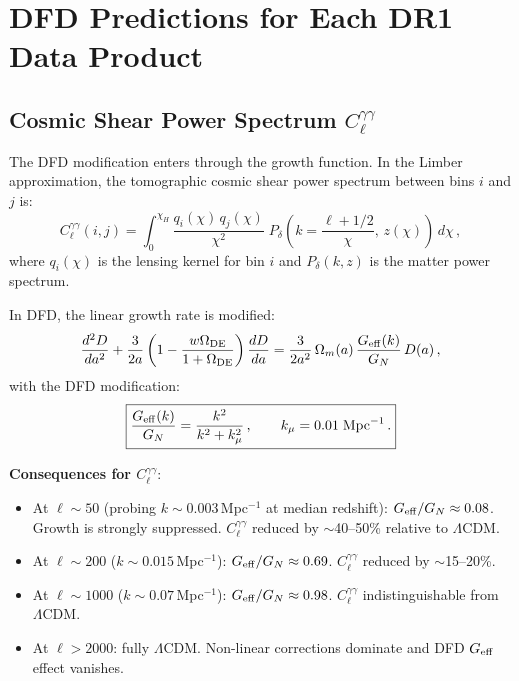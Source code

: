 \documentclass[11pt,a4paper]{article}
\newcommand{\LCDM}{$\Lambda$CDM}
\newcommand{\kmu}{k_\mu}
\newcommand{\Geff}{G_{\rm eff}}
\begin{document}
\section{DFD Predictions for Each DR1 Data Product}
\label{sec:predictions}

\subsection{Cosmic Shear Power Spectrum $C_\ell^{\gamma\gamma}$}

The DFD modification enters through the growth function. In the Limber
approximation, the tomographic cosmic shear power spectrum between bins
$i$ and $j$ is:
\begin{equation}
C_\ell^{\gamma\gamma}(i,j) = \int_0^{\chi_H}
  \frac{q_i(\chi)\,q_j(\chi)}{\chi^2}\;
  P_\delta\!\left(k = \frac{\ell+1/2}{\chi},\,z(\chi)\right)\,d\chi\,,
\label{eq:Cl_shear}
\end{equation}
where $q_i(\chi)$ is the lensing kernel for bin $i$ and $P_\delta(k,z)$
is the matter power spectrum.

In DFD, the linear growth rate is modified:
\begin{equation}
\frac{d^2 D}{da^2} + \frac{3}{2a}\left(1 - \frac{w \Omega_{\rm DE}}{1+\Omega_{\rm DE}}\right)\frac{dD}{da}
  = \frac{3}{2a^2}\,\Omega_m(a)\,\frac{\Geff(k)}{G_N}\,D(a)\,,
\end{equation}
with the DFD modification:
\begin{equation}
\boxed{\frac{\Geff(k)}{G_N} = \frac{k^2}{k^2 + \kmu^2}\,,
\qquad \kmu = 0.01\;\text{Mpc}^{-1}\,.}
\label{eq:Geff}
\end{equation}

\textbf{Consequences for $C_\ell^{\gamma\gamma}$}:
\begin{itemize}[nosep]
\item At $\ell \sim 50$ (probing $k \sim 0.003$\,Mpc$^{-1}$ at median
  redshift): $\Geff/G_N \approx 0.08$. Growth is strongly suppressed.
  $C_\ell^{\gamma\gamma}$ reduced by $\sim$40--50\% relative to \LCDM.
\item At $\ell \sim 200$ ($k \sim 0.015$\,Mpc$^{-1}$):
  $\Geff/G_N \approx 0.69$. $C_\ell^{\gamma\gamma}$ reduced by
  $\sim$15--20\%.
\item At $\ell \sim 1000$ ($k \sim 0.07$\,Mpc$^{-1}$):
  $\Geff/G_N \approx 0.98$. $C_\ell^{\gamma\gamma}$ indistinguishable
  from \LCDM.
\item At $\ell > 2000$: fully \LCDM. Non-linear corrections dominate and
  DFD $\Geff$ effect vanishes.
\end{itemize}
\end{document}
